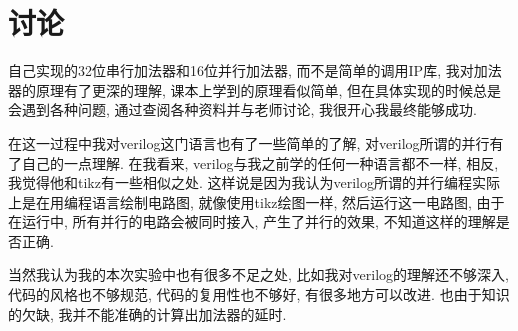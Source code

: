 \documentclass[AutoFakeBold]{LZUThesis}
\begin{document}
\section{讨论}
自己实现的32位串行加法器和16位并行加法器, 而不是简单的调用IP库, 我对加法器的原理有了更深的理解, 课本上学到的原理看似简单, 但在具体实现的时候总是会遇到各种问题, 
通过查阅各种资料并与老师讨论, 我很开心我最终能够成功.

在这一过程中我对verilog这门语言也有了一些简单的了解, 对verilog所谓的并行有了自己的一点理解. 
在我看来, verilog与我之前学的任何一种语言都不一样, 相反, 我觉得他和tikz有一些相似之处. 
这样说是因为我认为verilog所谓的并行编程实际上是在用编程语言绘制电路图, 就像使用tikz绘图一样,
然后运行这一电路图, 由于在运行中, 所有并行的电路会被同时接入, 产生了并行的效果, 不知道这样的理解是否正确.

当然我认为我的本次实验中也有很多不足之处, 比如我对verilog的理解还不够深入, 代码的风格也不够规范, 代码的复用性也不够好, 有很多地方可以改进.
也由于知识的欠缺, 我并不能准确的计算出加法器的延时.
\backmatter





\Appendix



\end{document}
